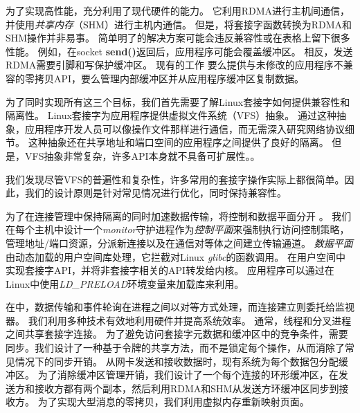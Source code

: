 为了实现高性能，\sys{}充分利用了现代硬件的能力。 它利用RDMA进行主机间通信，并使用\emph {共享内存}（SHM）进行主机内通信。 但是，将套接字函数转换为RDMA和SHM操作并非易事。 简单明了的解决方案可能会违反兼容性或在表格上留下很多性能。 例如，在socket \textbf {send()}返回后，应用程序可能会覆盖缓冲区。 相反，发送RDMA需要引脚和写保护缓冲区。 现有的工作 \cite {rsockets}要么提供与未修改的应用程序不兼容的零拷贝API，要么管理内部缓冲区并从应用程序缓冲区复制数据。

为了同时实现所有这三个目标，我们首先需要了解Linux套接字如何提供兼容性和隔离性。 Linux套接字为应用程序提供虚拟文件系统（VFS）抽象。 通过这种抽象，应用程序开发人员可以像操作文件那样进行通信，而无需深入研究网络协议细节。 这种抽象还在共享地址和端口空间的应用程序之间提供了良好的隔离。 但是，VFS抽象非常复杂，许多API本身就不具备可扩展性。\cite {clark1989analysis,boyd2010analysis,jeong2014mtcp}。

我们发现尽管VFS的普遍性和复杂性，许多常用的套接字操作实际上都很简单。因此，我们的设计原则是针对常见情况进行优化，同时保持兼容性。

为了在连接管理中保持隔离的同时加速数据传输，\sys {}将控制和数据平面分开 \cite {peter2016arrakis}。
我们在每个主机中设计一个\emph {monitor}守护进程作为\emph {控制平面}来强制执行访问控制策略，管理地址/端口资源，分派新连接以及在通信对等体之间建立传输通道。
\emph {数据平面}由动态加载的用户空间库\libipc {}处理，它拦截对Linux \emph {glibc}的函数调用。 \libipc {}在用户空间中实现套接字API，并将非套接字相关的API转发给内核。
应用程序可以通过在Linux中使用\emph {LD\_PRELOAD}环境变量来加载库来利用\libipc {}。


在\sys {}中，数据传输和事件轮询在进程之间以对等方式处理，而连接建立则委托给监视器。
我们利用多种技术有效地利用硬件并提高系统效率。
通常，线程和分叉进程之间共享套接字连接。
为了避免访问套接字元数据和缓冲区中的竞争条件，需要同步。我们设计了一种基于令牌的共享方法，而不是锁定每个操作，从而消除了常见情况下的同步开销。
从网卡发送和接收数据时，现有系统为每个数据包分配缓冲区。
为了消除缓冲区管理开销，我们设计了一个每个连接的环形缓冲区，在发送方和接收方都有两个副本，然后利用RDMA和SHM从发送方环缓冲区同步到接收方。
为了实现大型消息的零拷贝，我们利用虚拟内存重新映射页面。

